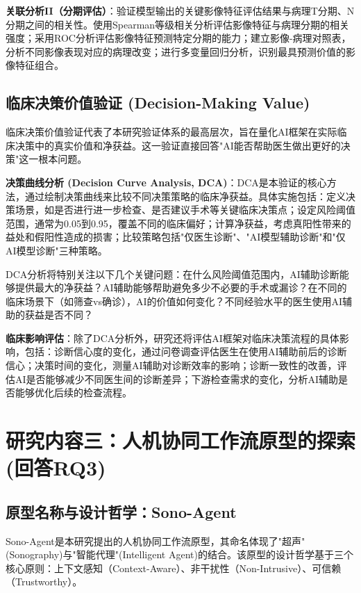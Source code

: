 \textbf{关联分析II（分期评估）}：验证模型输出的关键影像特征评估结果与病理T分期、N分期之间的相关性。使用Spearman等级相关分析评估影像特征与病理分期的相关强度；采用ROC分析评估影像特征预测特定分期的能力；建立影像-病理对照表，分析不同影像表现对应的病理改变；进行多变量回归分析，识别最具预测价值的影像特征组合。

\subsection{临床决策价值验证 (Decision-Making Value)}

临床决策价值验证代表了本研究验证体系的最高层次，旨在量化AI框架在实际临床决策中的真实价值和净获益。这一验证直接回答"AI能否帮助医生做出更好的决策"这一根本问题。

\textbf{决策曲线分析 (Decision Curve Analysis, DCA)}：DCA是本验证的核心方法，通过绘制决策曲线来比较不同决策策略的临床净获益。具体实施包括：定义决策场景，如是否进行进一步检查、是否建议手术等关键临床决策点；设定风险阈值范围，通常为0.05到0.95，覆盖不同的临床偏好；计算净获益，考虑真阳性带来的益处和假阳性造成的损害；比较策略包括"仅医生诊断"、"AI模型辅助诊断"和"仅AI模型诊断"三种策略。

DCA分析将特别关注以下几个关键问题：在什么风险阈值范围内，AI辅助诊断能够提供最大的净获益？AI辅助能够帮助避免多少不必要的手术或漏诊？在不同的临床场景下（如筛查vs确诊），AI的价值如何变化？不同经验水平的医生使用AI辅助的获益是否不同？

\textbf{临床影响评估}：除了DCA分析外，研究还将评估AI框架对临床决策流程的具体影响，包括：诊断信心度的变化，通过问卷调查评估医生在使用AI辅助前后的诊断信心；决策时间的变化，测量AI辅助对诊断效率的影响；诊断一致性的改善，评估AI是否能够减少不同医生间的诊断差异；下游检查需求的变化，分析AI辅助是否能够优化后续的检查流程。

\section{研究内容三：人机协同工作流原型的探索 (回答RQ3)}

\subsection{原型名称与设计哲学：Sono-Agent}

Sono-Agent是本研究提出的人机协同工作流原型，其命名体现了"超声"(Sonography)与"智能代理"(Intelligent Agent)的结合。该原型的设计哲学基于三个核心原则：上下文感知（Context-Aware）、非干扰性（Non-Intrusive）、可信赖（Trustworthy）。

